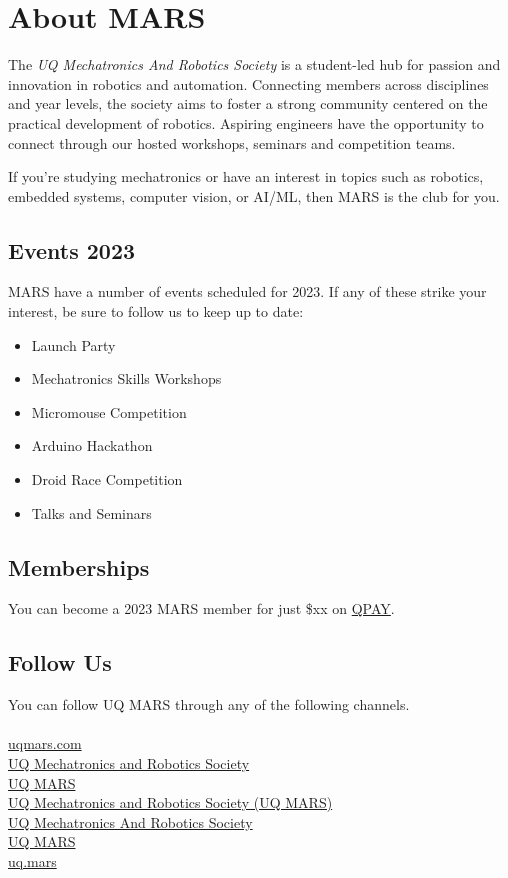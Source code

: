 \chapter{About MARS}
The \textit{UQ Mechatronics And Robotics Society} is a student-led hub for passion and innovation in robotics and automation.
Connecting members across disciplines and year levels, the society aims to foster a strong community centered on the practical development of robotics.
Aspiring engineers have the opportunity to connect through our hosted workshops, seminars and competition teams.

If you're studying mechatronics or have an interest in topics such as robotics, embedded systems, computer vision, or AI/ML, then MARS is the club for you.

\section{Events 2023}
MARS have a number of events scheduled for 2023. If any of these strike your interest, be sure to follow us to keep up to date:
\begin{itemize}
    \item Launch Party
    \item Mechatronics Skills Workshops
    \item Micromouse Competition
    \item Arduino Hackathon
    \item Droid Race Competition
    \item Talks and Seminars
\end{itemize}

\section{Memberships}
You can become a 2023 MARS member for just \$xx on \href{https://uqmars.getqpay.com/}{QPAY}.

\section{Follow Us}
You can follow UQ MARS through any of the following channels. \\ \\
\faLink{} \href{https://www.uqmars.com}{uqmars.com} \\
\faDiscord{} \href{https://discord.gg/vjY49Q8}{UQ Mechatronics and Robotics Society} \\
\faFacebookSquare{} \href{https://facebook.com/UQMARS}{UQ MARS} \\
\faLinkedin{} \href{https://linkedin.com/company/uq-mars}{UQ Mechatronics and Robotics Society (UQ MARS)} \\
\faGithubSquare{} \href{https://github.com/uqmars}{UQ Mechatronics And Robotics Society} \\
\faYoutube{} \href{https://www.youtube.com/channel/UCH3GjoKLL3R_1ayjkn9C78A}{UQ MARS} \\
\faInstagram{} \href{https://www.instagram.com/uq.mars/}{uq.mars} \\
